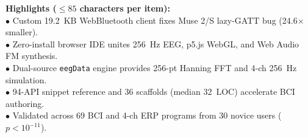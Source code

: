 \documentclass[10pt,twocolumn]{article}
\begin{document}
\begin{abstract}
\noindent\textbf{Comparison with Existing Methods:} Compared to native desktop LSL toolchains (\texttt{BlueMuse}/\texttt{muselsl} + Python) and legacy WebBluetooth bundles (\texttt{muse-js} + \texttt{RxJS}, 473.0~KB), BrainImation reduces compiled BLE client footprint by $\BundleReductionFactor\times$, eliminates Muse~2/S \texttt{NotFoundError} connection crashes, and removes all operating-system driver and inter-process socket dependencies.\\
\noindent\textbf{Conclusions:} BrainImation establishes a reproducible, zero-install browser architecture for rapid prototyping and instruction in closed-loop neurofeedback, brain--computer music interfacing, and online ERP methodology.\\[3pt]
\noindent\textbf{Keywords:} electroencephalography (EEG), brain--computer interface (BCI), WebBluetooth, neurofeedback, event-related potentials (ERPs), open-source software
\end{abstract}

\vspace{2pt}
\noindent\colorbox{codebg}{\parbox{0.97\columnwidth}{\scriptsize\textbf{Highlights ($\le 85$ characters per item):}\\
$\bullet$ Custom 19.2~KB WebBluetooth client fixes Muse 2/S lazy-GATT bug (24.6$\times$ smaller).\\
$\bullet$ Zero-install browser IDE unites 256~Hz EEG, p5.js WebGL, and Web Audio FM synthesis.\\
$\bullet$ Dual-source \texttt{eegData} engine provides 256-pt Hanning FFT and 4-ch 256~Hz simulation.\\
$\bullet$ 94-API snippet reference and 36 scaffolds (median 32~LOC) accelerate BCI authoring.\\
$\bullet$ Validated across 69 BCI and 4-ch ERP programs from 30 novice users ($p < 10^{-11}$).}}
\vspace{4pt}
\end{document}
